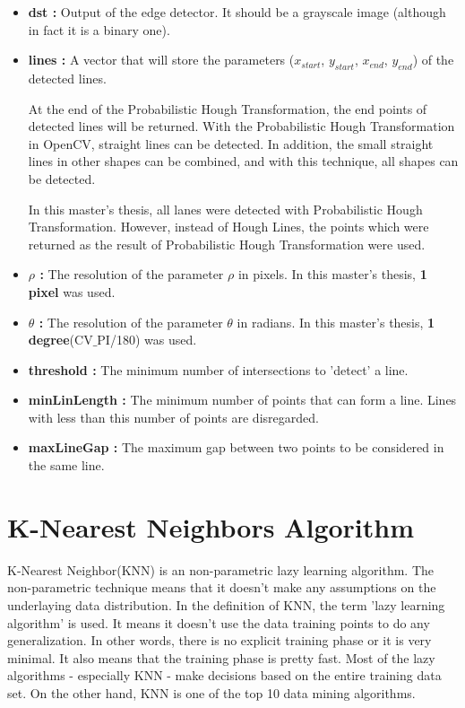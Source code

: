 \begin{itemize}

\item \textbf{dst : }Output of the edge detector. It should be a grayscale image (although in fact it is a binary one).
 
\item \textbf{lines : }A vector that will store the parameters ($ x_{start} $, $ y_{start} $, $ x_{end} $, $ y_{end} $) of the detected lines.

At the end of the Probabilistic Hough Transformation, the end points of detected lines will be returned. With the Probabilistic Hough Transformation in OpenCV, straight lines can be detected. In addition, the small straight lines in other shapes can be combined, and with this technique, all shapes can be detected.  

In this master's thesis, all lanes were detected with Probabilistic Hough Transformation. However, instead of Hough Lines, the points which were returned as the result of Probabilistic Hough Transformation were used.

\item \textbf{$ \rho $ : }The resolution of the parameter $ \rho $ in pixels. In this master's thesis, \textbf{1 pixel} was used.

\item \textbf{$ \theta $ : }The resolution of the parameter $ \theta $ in radians. In this master's thesis, \textbf{1 degree}(CV$ \_ $PI/180) was used.

\item \textbf{threshold : }The minimum number of intersections to 'detect' a line.

\item \textbf{minLinLength : }The minimum number of points that can form a line. Lines with less than this number of points are disregarded.

\item \textbf{maxLineGap : }The maximum gap between two points to be considered in the same line.

\end{itemize}



%
\section{K-Nearest Neighbors Algorithm}\label{sec:K-Nearest Neighbors Algorithm}
%
K-Nearest Neighbor(KNN) is an non-parametric lazy learning algorithm. The non-parametric technique means that it doesn't make any assumptions on the underlaying data distribution. In the definition of KNN, the term 'lazy learning algorithm' is used. It means it doesn't use the data training points to do any generalization. In other words, there is no explicit training phase or it is very minimal.  It also means that the training phase is pretty fast. Most of the lazy algorithms - especially KNN - make decisions based on the entire training data set. On the other hand, KNN is one of the top 10 data mining algorithms\cite{k_nearest_neighbors}.

